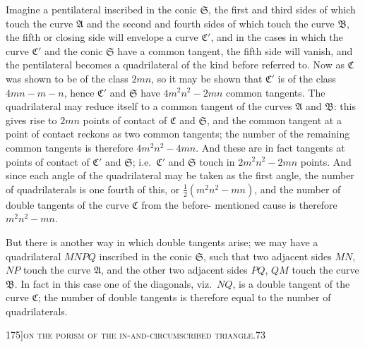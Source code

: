 \documentclass[11pt]{article}
\begin{document}
Imagine a pentilateral inscribed in the conic $\mathfrak{S}$, the first and third sides of which
touch the curve $\mathfrak{A}$ and the second and fourth sides of which touch the curve $\mathfrak{B}$,
the fifth or closing side will envelope a curve $\mathfrak{C}'$, and in the cases in which the
curve $\mathfrak{C}'$ and the conic $\mathfrak{S}$ have a common tangent, the fifth side will vanish, and
the pentilateral becomes a quadrilateral of the kind before referred to. Now as $\mathfrak{C}$
was shown to be of the class $2mn$, so it may be shown that $\mathfrak{C}'$ is of the class
$4mn - m - n$, hence $\mathfrak{C}'$ and $\mathfrak{S}$ have $4m^{2}n^{2} - 2mn$ common tangents. The quadrilateral may reduce
itself to a common tangent of the curves $\mathfrak{A}$ and $\mathfrak{B}$: this gives rise to $2mn$ points
of contact of $\mathfrak{C}$ and $\mathfrak{S}$, and the common tangent at a point of contact reckons as
two common tangents; the number of the remaining common tangents is therefore
$4m^{2}n^{2} - 4mn$. And these are in fact tangents at points of contact of $\mathfrak{C}'$ and $\mathfrak{S}$;
i.e.\ $\mathfrak{C}'$ and $\mathfrak{S}$ touch in $2m^{2}n^{2} - 2mn$ points. And since each angle of the quadrilateral
may be taken as the first angle, the number of quadrilaterals is one fourth of this,
or $\tfrac{1}{2}(m^{2}n^{2} - mn)$, and the number of double tangents of the curve $\mathfrak{C}$ from the before-
mentioned cause is therefore $m^{2}n^{2} - mn$.

But there is another way in which double tangents arise; we may have a quad\-rilateral $MNPQ$ inscribed in the conic $\mathfrak{S}$, such that two adjacent sides $MN$, $NP$
touch the curve $\mathfrak{A}$, and the other two adjacent sides $PQ$, $QM$ touch the curve $\mathfrak{B}$.
In fact in this case one of the diagonals, viz.\ $NQ$, is a double tangent of the curve
$\mathfrak{C}$; the number of double tangents is therefore equal to the number of quadrilaterals.

\newpage

\begin{center}
\small 175]\hfill\textsc{on the porism of the in-and-circumscribed triangle.}\hfill\textsc{73}
\end{center}

\medskip
\end{document}
